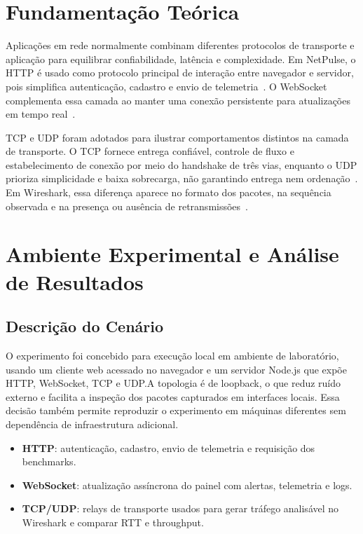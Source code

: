 \documentclass[conference]{IEEEtran}
\begin{document}
\section{Fundamentação Teórica}
Aplicações em rede normalmente combinam diferentes protocolos de transporte e aplicação para equilibrar confiabilidade, latência e complexidade. Em NetPulse, o HTTP é usado como protocolo principal de interação entre navegador e servidor, pois simplifica autenticação, cadastro e envio de telemetria~\cite{rfc9110}. O WebSocket complementa essa camada ao manter uma conexão persistente para atualizações em tempo real~\cite{rfc6455}.

TCP e UDP foram adotados para ilustrar comportamentos distintos na camada de transporte. O TCP fornece entrega confiável, controle de fluxo e estabelecimento de conexão por meio do handshake de três vias, enquanto o UDP prioriza simplicidade e baixa sobrecarga, não garantindo entrega nem ordenação~\cite{rfc793,rfc768}. Em Wireshark, essa diferença aparece no formato dos pacotes, na sequência observada e na presença ou ausência de retransmissões~\cite{wireshark}.

\section{Ambiente Experimental e Análise de Resultados}
\subsection{Descrição do Cenário}
O experimento foi concebido para execução local em ambiente de laboratório, usando um cliente web acessado no navegador e um servidor Node.js que expõe HTTP, WebSocket, TCP e UDP.\@ A topologia é de loopback, o que reduz ruído externo e facilita a inspeção dos pacotes capturados em interfaces locais. Essa decisão também permite reproduzir o experimento em máquinas diferentes sem dependência de infraestrutura adicional.

\begin{itemize}
\item \textbf{HTTP}: autenticação, cadastro, envio de telemetria e requisição dos benchmarks.
\item \textbf{WebSocket}: atualização assíncrona do painel com alertas, telemetria e logs.
\item \textbf{TCP/UDP}: relays de transporte usados para gerar tráfego analisável no Wireshark e comparar RTT e throughput.
\end{itemize}
\end{document}
